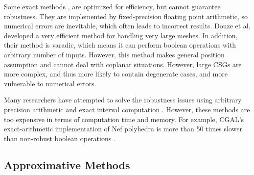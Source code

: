 Some exact methods \cite{ogayar2015deferred,douze2015quickcsg,zhou2016mesh,xu2013fast,feito2013fast}, are optimized for efficiency, but cannot guarantee robustness. They are implemented by fixed-precision floating point arithmetic, so numerical errors are inevitable, which often leads to incorrect results.
Douze et al. \cite{douze2015quickcsg} developed a very efficient method for handling very large meshes. In addition, their method is varadic, which means it can perform boolean operations with arbitrary number of inputs. However, this method makes general position assumption and cannot deal with coplanar situations. However, large CSGs are more complex, and thus more likely to contain degenerate cases, and more vulnerable to numerical errors.


Many researchers have attempted to solve the robustness issues using arbitrary precision arithmetic \cite{banerjee1996topologically, fortune1995polyhedral, keyser2004esolid, granados2003boolean, hachenberger2005boolean} and exact interval computation \cite{fang1993robustness, hu1996robust, segal1990using}. However, these methods are too expensive in terms of computation time and memory. For example, CGAL's \cite{cgal:hk-bonp3-15a} exact-arithmetic implementation \cite{granados2003boolean} of Nef polyhedra \cite{bieri1988elementary} is more than 50 times slower than non-robust boolean operations \cite{bernstein2009fast}.



\subsection{Approximative Methods}


